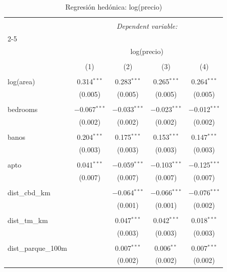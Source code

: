 
\begin{table}[!htbp] \centering 
  \caption{Regresión hedónica: log(precio)} 
  \label{} 
\begin{tabular}{@{\extracolsep{5pt}}lcccc} 
\\[-1.8ex]\hline 
\hline \\[-1.8ex] 
 & \multicolumn{4}{c}{\textit{Dependent variable:}} \\ 
\cline{2-5} 
\\[-1.8ex] & \multicolumn{4}{c}{log(precio)} \\ 
\\[-1.8ex] & (1) & (2) & (3) & (4)\\ 
\hline \\[-1.8ex] 
 log(area) & 0.314$^{***}$ & 0.283$^{***}$ & 0.265$^{***}$ & 0.264$^{***}$ \\ 
  & (0.005) & (0.005) & (0.005) & (0.005) \\ 
  & & & & \\ 
 bedrooms & $-$0.067$^{***}$ & $-$0.033$^{***}$ & $-$0.023$^{***}$ & $-$0.012$^{***}$ \\ 
  & (0.002) & (0.002) & (0.002) & (0.002) \\ 
  & & & & \\ 
 banos & 0.204$^{***}$ & 0.175$^{***}$ & 0.153$^{***}$ & 0.147$^{***}$ \\ 
  & (0.003) & (0.003) & (0.003) & (0.003) \\ 
  & & & & \\ 
 apto & 0.041$^{***}$ & $-$0.059$^{***}$ & $-$0.103$^{***}$ & $-$0.125$^{***}$ \\ 
  & (0.007) & (0.007) & (0.007) & (0.007) \\ 
  & & & & \\ 
 dist\_cbd\_km &  & $-$0.064$^{***}$ & $-$0.066$^{***}$ & $-$0.076$^{***}$ \\ 
  &  & (0.001) & (0.001) & (0.002) \\ 
  & & & & \\ 
 dist\_tm\_km &  & 0.047$^{***}$ & 0.042$^{***}$ & 0.018$^{***}$ \\ 
  &  & (0.003) & (0.003) & (0.003) \\ 
  & & & & \\ 
 dist\_parque\_100m &  & 0.007$^{***}$ & 0.006$^{**}$ & 0.007$^{***}$ \\ 
  &  & (0.002) & (0.002) & (0.002) \\ 

\end{tabular}
\end{table}
